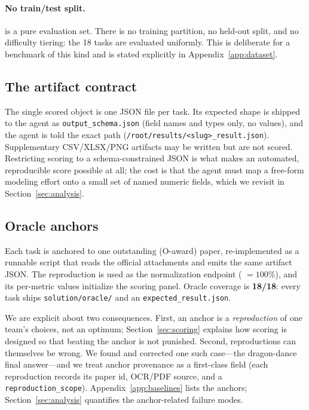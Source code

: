 \paragraph{No train/test split.} \bench{} is a pure evaluation set. There is no training partition, no held-out split, and no difficulty tiering: the 18 tasks are evaluated uniformly. This is deliberate for a benchmark of this kind and is stated explicitly in Appendix~\ref{app:dataset}.

\subsection{The artifact contract}
The single scored object is one JSON file per task. Its expected shape is shipped to the agent as \texttt{output\_schema.json} (field names and types only, no values), and the agent is told the exact path (\texttt{/root/results/<slug>\_result.json}). Supplementary CSV/XLSX/PNG artifacts may be written but are not scored. Restricting scoring to a schema-constrained JSON is what makes an automated, reproducible score possible at all; the cost is that the agent must map a free-form modeling effort onto a small set of named numeric fields, which we revisit in Section~\ref{sec:analysis}.

\subsection{Oracle anchors}
Each task is anchored to one outstanding (O-award) paper, re-implemented as a runnable script that reads the official attachments and emits the same artifact JSON. The reproduction is used as the normalization endpoint (\oeval{} $=100\%$), and its per-metric values initialize the scoring panel. Oracle coverage is \textbf{18/18}: every task ships \texttt{solution/oracle/} and an \texttt{expected\_result.json}.

We are explicit about two consequences. First, an anchor is a \emph{reproduction} of one team's choices, not an optimum; Section~\ref{sec:scoring} explains how scoring is designed so that beating the anchor is not punished. Second, reproductions can themselves be wrong. We found and corrected one such case---the dragon-dance final answer---and we treat anchor provenance as a first-class field (each reproduction records its paper id, OCR/PDF source, and a \texttt{reproduction\_scope}). Appendix~\ref{app:baselines} lists the anchors; Section~\ref{sec:analysis} quantifies the anchor-related failure modes.
